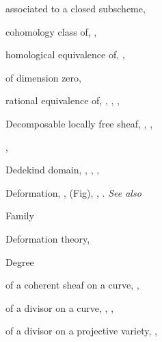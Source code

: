 {{\noindent\hspace*{7.5bp}associated to a closed subscheme, \par
\noindent\hspace*{7.5bp}cohomology class of, , \par
\noindent\hspace*{7.5bp}homological equivalence of, , \par
\noindent\hspace*{7.5bp}of dimension zero, \par
\noindent\hspace*{7.5bp}rational equivalence of, , , , \par
\vspace{8.55bp}
\noindent\hspace*{0.0bp}Decomposable locally free sheaf, , ,\par
\noindent\hspace*{15.0bp}, \par
\noindent\hspace*{0.0bp}Dedekind domain, , , , \par
\noindent\hspace*{0.0bp}Deformation, ,  (Fig), , . \emph{See also}\par
\noindent\hspace*{15.0bp}Family\par
\noindent\hspace*{0.0bp}Deformation theory, \par
\noindent\hspace*{0.0bp}Degree\par
\noindent\hspace*{7.5bp}of a coherent sheaf on a curve, , \par
\noindent\hspace*{7.5bp}of a divisor on a curve, , , \par
\noindent\hspace*{7.5bp}of a divisor on a projective variety, ,\par
\noindent\hspace*{15.0bp}\par
}}
